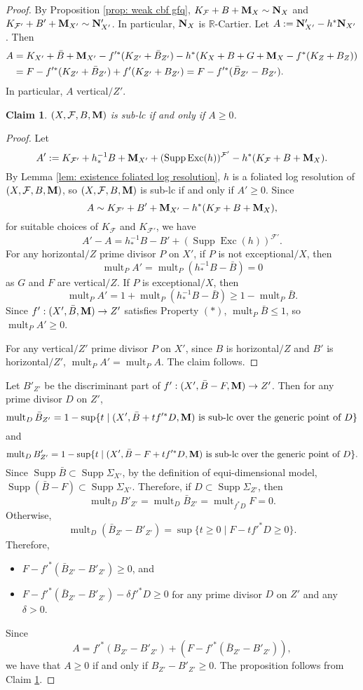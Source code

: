\documentclass[11pt]{amsart}
\numberwithin{equation}{section}
\newcommand{\Mm}{{\bf{M}}}
\newcommand{\Nn}{{\bf{N}}}
\newcommand{\Rr}{\mathbb{R}}
\newcommand{\Exc}{\operatorname{Exc}}
\newcommand{\Supp}{\operatorname{Supp}}
\newcommand{\mult}{\operatorname{mult}}
\newcommand{\Ff}{\mathcal{F}}
\newtheorem{claim}[thm]{Claim}
\theoremstyle{definition}
\theoremstyle{definition}
\theoremstyle{definition}
\begin{document}
\begin{proof}
By Proposition \ref{prop: weak cbf gfq}, $K_{\Ff}+B+\Mm_X\sim\Nn_X$ and $K_{\Ff'}+B'+\Mm_{X'}\sim\Nn'_{X'}$. In particular,  $\Nn_X$ is $\Rr$-Cartier. Let $A:=\Nn'_{X'}-h^*\Nn_{X'}$. Then 
\begin{align*}
    A&=K_{X'}+\bar B+\Mm_{X'}-f'^*(K_{Z'}+\bar B_{Z'})-h^*(K_X+B+G+\Mm_X-f^*(K_Z+B_Z))\\
    &=F-f'^*(K_{Z'}+\bar B_{Z'})+f'(K_{Z'}+B_{Z'})=F-f'^*(\bar B_{Z'}-B_{Z'}).
\end{align*}
In particular, $A$ vertical$/Z'$.
\begin{claim}\label{claim: a' for semistable}
    $(X,\Ff,B,\Mm)$ is sub-lc if and only if $A\geq 0$.
\end{claim}
\begin{proof}
    Let 
    $$A':=K_{\Ff'}+h^{-1}_*B+\Mm_{X'}+(\Supp\Exc(h))^{\Ff'}-h^*(K_{\Ff}+B+\Mm_X).$$
    By Lemma \ref{lem: existence foliated log resolution}, $h$ is a foliated log resolution of $(X,\Ff,B,\Mm)$, so  $(X,\Ff,B,\Mm)$ is sub-lc if and only if $A'\geq 0$. Since
    $$A\sim K_{\Ff'}+B'+\Mm_{X'}-h^*(K_{\Ff}+B+\Mm_X),$$
    for suitable choices of $K_{\Ff}$ and $K_{\Ff'}$, we have
    $$A'-A=h^{-1}_*B-B'+(\Supp\Exc(h))^{\Ff'}.$$
    For any horizontal$/Z$ prime divisor $P$ on $X'$, if $P$ is not exceptional$/X$, then
    $$\mult_PA'=\mult_P(h^{-1}_*B-\bar B)=0$$
    as $G$ and $F$ are vertical$/Z$. If $P$ is exceptional$/X$, then
    $$\mult_PA'=1+\mult_P(h^{-1}_*B-\bar B)\geq 1-\mult_P\bar B.$$
    Since $f': (X',\bar B,\Mm)\rightarrow Z'$ satisfies Property $(*)$, $\mult_P\bar B\leq 1$, so $\mult_PA'\geq 0$.

    For any vertical$/Z'$ prime divisor $P$ on $X'$, since $B$ is horizontal$/Z$ and $B'$ is horizontal$/Z'$, $\mult_PA'=\mult_PA$. The claim follows.
\end{proof}
 Let $B'_{Z'}$ be the discriminant part of $f': (X',\bar B-F,\Mm)\rightarrow Z'$. Then for any prime divisor $D$ on $Z'$,
     $$\mult_D\bar B_{Z'}=1-\sup\{t\mid (X',\bar B+tf'^*D,\Mm)\text{ is sub-lc over the generic point of }D\}$$
     and
    $$\mult_D B'_{Z'}=1-\sup\{t\mid (X',\bar B-F+tf'^*D,\Mm)\text{ is sub-lc over the generic point of }D\}.$$
    Since $\Supp\bar B\subset\Supp\Sigma_{X'}$, by the definition of equi-dimensional model, $\Supp(\bar B-F)\subset\Supp\Sigma_{X'}$. Therefore, if $D\subset\Supp\Sigma_{Z'}$, then
    $$\mult_D B'_{Z'}=\mult_D\bar B_{Z'}=\mult_{f^*D}F=0.$$
    Otherwise,
    $$\mult_D(\bar B_{Z'}-B'_{Z'})=\sup\{t\geq 0\mid F-tf'^*D\geq 0\}.$$
    Therefore, 
    \begin{itemize}
        \item  $F-f'^*(\bar B_{Z'}-B'_{Z'})\geq 0$, and
        \item  $F-f'^*(\bar B_{Z'}-B'_{Z'})-\delta f'^*D\geq 0$ for any prime divisor $D$ on $Z'$ and any $\delta>0$.
    \end{itemize}
Since
$$A=f'^*(B_{Z'}-B'_{Z'})+(F-f'^*(\bar B_{Z'}-B'_{Z'})),$$
we have that $A\geq 0$ if and only if $B_{Z'}-B'_{Z'}\geq 0$. The proposition follows from Claim \ref{claim: a' for semistable}.
\end{proof}
\end{document}
